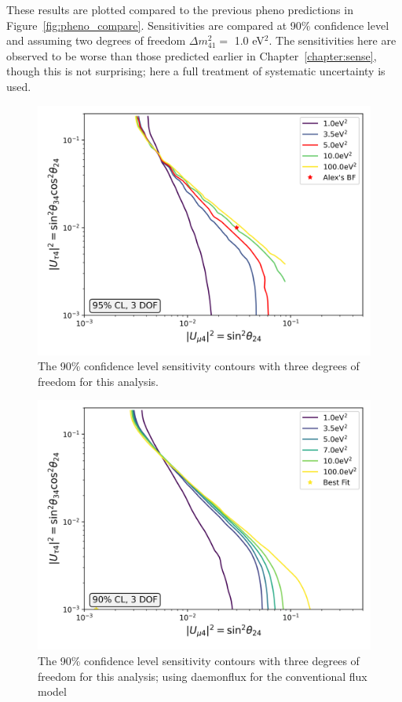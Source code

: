 \documentclass[main.tex]{subfiles}
\begin{document}
These results are plotted compared to the previous pheno predictions in Figure~\ref{fig:pheno_compare}. 
Sensitivities are compared at 90\% confidence level and assuming two degrees of freedom $\Delta m_{41}^{2}=$ 1.0 eV$^{2}$.
The sensitivities here are observed to be worse than those predicted earlier in Chapter~\ref{chapter:sense}, though this is not surprising; here a full treatment of systematic uncertainty is used.

\begin{figure}
    \centering
    \includegraphics[width=0.7\linewidth]{figures/joint_asimov_oldairs_Realization_Asimov_sterile_0_cl0.95_dof3}
    \caption{The 90\% confidence level sensitivity contours with three degrees of freedom for this analysis.}\label{fig:asimov_sense}
\end{figure}


\begin{figure}
    \centering
    \includegraphics[width=0.7\linewidth]{figures/joint_daemon_asimov_with_flavor_update_Realization_daemon_newflavor_Asimov_sterile_0_cl0.9_dof3.png}
    \caption{The 90\% confidence level sensitivity contours with three degrees of freedom for this analysis; using daemonflux for the conventional flux model}\label{fig:asimov_daemon_sense}
\end{figure}
\end{document}
